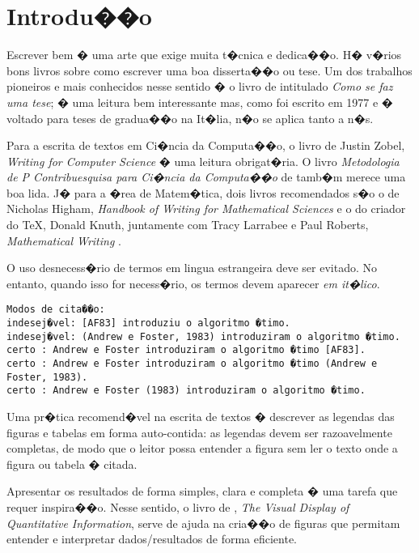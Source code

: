 \chapter{Introdu��o}
\label{cap:introducao}

Escrever bem � uma arte que exige muita t�cnica e dedica��o. H� v�rios bons livros
sobre como escrever uma boa disserta��o ou tese. Um dos trabalhos pioneiros e mais
conhecidos nesse sentido � o livro de \citet{eco:09} intitulado 
\emph{Como se faz uma tese}; � uma leitura bem interessante mas, como foi escrito 
em 1977 e � voltado para teses de gradua��o na It�lia, n�o se aplica tanto a n�s.

Para a escrita de textos em Ci�ncia da Computa��o, o livro de Justin Zobel, 
\emph{Writing for Computer Science} \citep{zobel:04} � uma leitura obrigat�ria. 
O livro \emph{Metodologia de P Contribuesquisa para Ci�ncia da Computa��o} de 
\citet{waz:09} tamb�m merece uma boa lida.
J� para a �rea de Matem�tica, dois livros recomendados s�o o de Nicholas Higham,
\emph{Handbook of Writing for Mathematical Sciences} \citep{Higham:98} e o do criador
do \TeX, Donald Knuth, juntamente com Tracy Larrabee e Paul Roberts, 
\emph{Mathematical Writing} \citep{Knuth:96}.

O uso desnecess�rio de termos em lingua estrangeira deve ser evitado. No entanto,
quando isso for necess�rio, os termos devem aparecer \emph{em it�lico}.

\begin{small}
\begin{verbatim}
Modos de cita��o:
indesej�vel: [AF83] introduziu o algoritmo �timo.
indesej�vel: (Andrew e Foster, 1983) introduziram o algoritmo �timo.
certo : Andrew e Foster introduziram o algoritmo �timo [AF83].
certo : Andrew e Foster introduziram o algoritmo �timo (Andrew e Foster, 1983).
certo : Andrew e Foster (1983) introduziram o algoritmo �timo.
\end{verbatim}
\end{small}

Uma pr�tica recomend�vel na escrita de textos � descrever as legendas das
figuras e tabelas em forma auto-contida: as legendas devem ser razoavelmente
completas, de modo que o leitor possa entender a figura sem ler o texto onde a
figura ou tabela � citada.  

Apresentar os resultados de forma simples, clara e completa � uma tarefa que
requer inspira��o. Nesse sentido, o livro de \citet{tufte01:visualDisplay},
\emph{The Visual Display of Quantitative Information}, serve de ajuda na
cria��o de figuras que permitam entender e interpretar dados/resultados de forma
eficiente.


